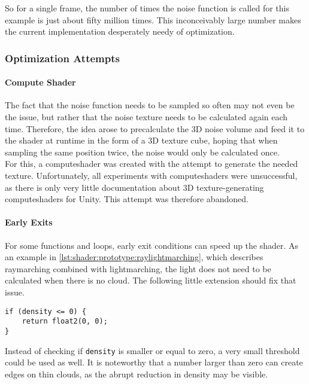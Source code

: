 \noindent
So for a single frame, the number of times the noise function is called for this example is just about fifty million times.
This inconceivably large number makes the current implementation desperately needy of optimization.

\subsubsection{Optimization Attempts}
\paragraph{Compute Shader}
The fact that the noise function needs to be sampled so often may not even be the issue, but rather that the noise texture needs to be calculated again each time.
Therefore, the idea arose to precalculate the 3D noise volume and feed it to the shader at runtime in the form of a 3D texture cube, hoping that when sampling the same position twice, the noise would only be calculated once.
\\
For this, a \gls{computeshader} was created with the attempt to generate the needed texture.
Unfortunately, all experiments with \gls{computeshader}s were unsuccessful, as there is only very little documentation about 3D texture-generating \gls{computeshader}s for Unity.
This attempt was therefore abandoned.

\paragraph{Early Exits}
For some functions and loops, early exit conditions can speed up the shader. As an example in \autoref{lst:shader:prototype:raylightmarching}, which describes \gls{raymarching} combined with \gls{lightmarching}, the light does not need to be calculated when there is no cloud.
The following little extension should fix that issue.
\begin{lstlisting}[language=HLSL]
if (density <= 0) {
    return float2(0, 0);
}
\end{lstlisting}

\noindent
Instead of checking if \lstinline[language=HLSL]{density} is smaller or equal to zero, a very small threshold could be used as well.
It is noteworthy that a number larger than zero can create edges on thin clouds, as the abrupt reduction in density may be visible.

\clearpage
